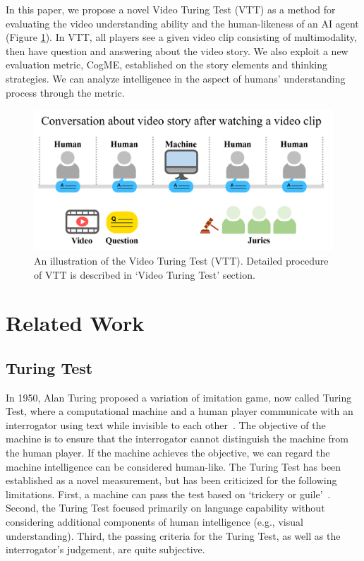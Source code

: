 \documentclass[letterpaper]{article} %
\begin{document}
In this paper, we propose a novel Video Turing Test (VTT) as a method for evaluating the video understanding ability and the human-likeness of an AI agent (Figure \ref{fig:vtt}). In VTT, all players see a given video clip consisting of multimodality, then have question and answering about the video story. We also exploit a new evaluation metric, CogME, established on the story elements and thinking strategies. We can analyze intelligence in the aspect of humans' understanding process through the metric.


\begin{figure}[t]
\centering
\includegraphics[width=0.9\columnwidth]{fig/vtt-concept.png}
\caption{An illustration of the Video Turing Test (VTT). Detailed procedure of VTT is described in `Video Turing Test' section.}
\label{fig:vtt}
\end{figure}

\section{Related Work}
\subsection{Turing Test}

In 1950, Alan Turing proposed a variation of imitation game, now called Turing Test, where a computational machine and a human player communicate with an interrogator using text while invisible to each other~\cite{turing1950computing}. The objective of the machine is to ensure that the interrogator cannot distinguish the machine from the human player. If the machine achieves the objective, we can regard the machine intelligence can be considered human-like. The Turing Test has been established as a novel measurement, but has been criticized for the following limitations. First, a machine can pass the test based on `trickery or guile'~\cite{weizenbaum1966eliza,shieber1994lessons,boden2006mind}.
Second, the Turing Test focused primarily on language capability without considering additional components of human intelligence (e.g., visual understanding). Third, the passing criteria for the Turing Test, as well as the interrogator's judgement, are quite subjective.
\end{document}
